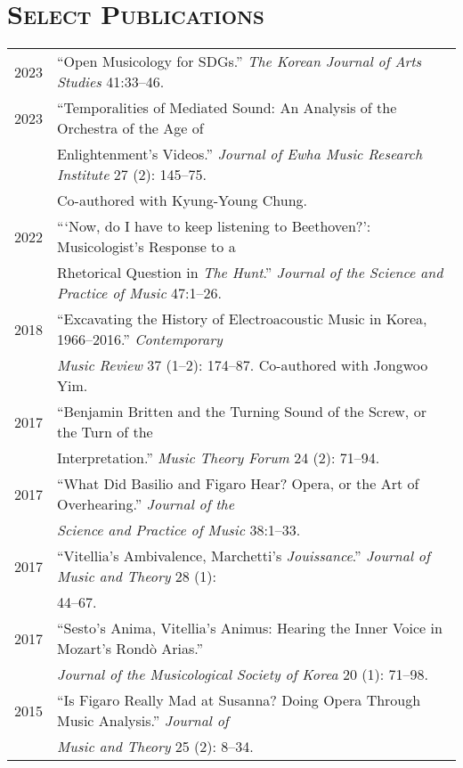 \documentclass[a4paper,11pt,draft]{article}
\begin{document}
  \section*{\textsc{Select Publications}}
  \hspace*{-0.25cm}
  \begin{tabular}{p{2.5cm} p{12.5cm}}
    2023 & ``Open Musicology for SDGs.'' \textit{The Korean Journal of Arts Studies} 41:33--46.\\[2mm]
    
    2023 & ``Temporalities of Mediated Sound: An Analysis of the Orchestra of the Age of\\
    & Enlightenment’s Videos.'' \textit{Journal of Ewha Music Research Institute} 27 (2): 145--75.\\
    & Co-authored with Kyung-Young Chung.\\[2mm]
    
    2022 & ``‘Now, do I have to keep listening to Beethoven?’: Musicologist’s Response to a\\
    & Rhetorical Question in \textit{The Hunt}.'' \textit{Journal of the Science and Practice of Music} 47:1--26.\\[2mm]
    
    2018 & ``Excavating the History of Electroacoustic Music in Korea,
    1966--2016.'' \textit{Contemporary}\\
    & \textit{Music Review} 37 (1--2): 174--87. Co-authored with Jongwoo
    Yim.\\[2mm]
    
    2017 & ``Benjamin Britten and the Turning Sound of the Screw, or the Turn
    of the\\
    & Interpretation.'' \textit{Music Theory Forum} 24 (2): 71--94.\\[2mm]
    
    2017 & ``What Did Basilio and Figaro Hear? Opera, or the Art of
    Overhearing.'' \textit{Journal of the}\\
    & \textit{Science and Practice of Music} 38:1--33.\\[2mm]
    
    2017 & ``Vitellia's Ambivalence, Marchetti's \textit{Jouissance}.''
    \textit{Journal of Music and Theory} 28 (1):\\
    & 44--67.\\[2mm]
    
    2017 & ``Sesto's Anima, Vitellia's Animus: Hearing the Inner Voice in
    Mozart's Rond\`{o} Arias.''\\
    & \textit{Journal of the Musicological Society of Korea} 20 (1):
    71--98.\\[2mm]
    
    2015 & ``Is Figaro Really Mad at Susanna? Doing Opera Through Music
    Analysis.'' \textit{Journal of}\\
    & \textit{Music and Theory} 25 (2): 8--34.
  \end{tabular}
  
\end{document}
